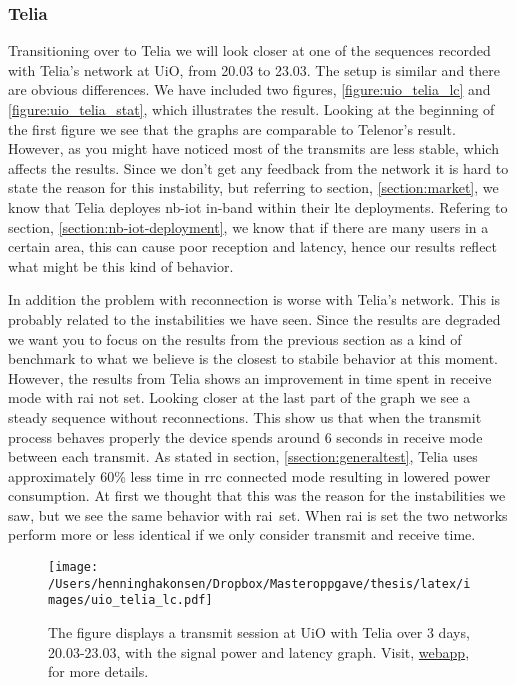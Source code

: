 \documentclass[USenglish]{ifimaster}  %
\begin{document}
\subsubsection{Telia}
Transitioning over to Telia we will look closer at one of the sequences recorded with Telia's network at UiO, from 20.03 to 23.03. The setup is similar and there are obvious differences. We have included two figures, \vref{figure:uio_telia_lc} and \vref{figure:uio_telia_stat}, which illustrates the result.
Looking at the beginning of the first figure we see that the graphs are comparable to Telenor's result. However, as you might have noticed most of the transmits are less stable, which affects the results. Since we don't get any feedback from the network it is hard to state the reason for this instability, but referring to section, \vref{section:market}, we know that Telia deployes \acrshort{nb-iot} in-band within their \acrshort{lte} deployments. Refering to section, \vref{section:nb-iot-deployment}, we know that if there are many users in a certain area, this can cause poor reception and latency, hence our results reflect what might be this kind of behavior.

In addition the problem with reconnection is worse with Telia's network. This is probably related to the instabilities we have seen. Since the results are degraded we want you to focus on the results from the previous section as a kind of benchmark to what we believe is the closest to stabile behavior at this moment. However, the results from Telia shows an improvement in time spent in receive mode with \acrshort{rai} not set. Looking closer at the last part of the graph we see a steady sequence without reconnections. This show us that when the transmit process behaves properly the device spends around 6 seconds in receive mode between each transmit. As stated in section, \vref{ssection:generaltest}, Telia uses approximately 60\% less time in \acrshort{rrc} connected mode resulting in lowered power consumption. At first we thought that this was the reason for the instabilities we saw, but we see the same behavior with \acrshort{rai} set. When \acrshort{rai} is set the two networks perform more or less identical if we only consider transmit and receive time.

\begin{figure}[H]
  \centering
  \texttt{[image: /Users/henninghakonsen/Dropbox/Masteroppgave/thesis/latex/images/uio\_telia\_lc.pdf]}
  \caption[Long-term test - Telia 20.03-23.03, signal power and latency]{The figure displays a transmit session at UiO with Telia over 3 days, 20.03-23.03, with the signal power and latency graph. Visit, \href{http://158.39.77.97:9000/\#/nodes/id1}{webapp}, for more details.}
  \label{figure:uio_telia_lc}
\end{figure}
\end{document}
